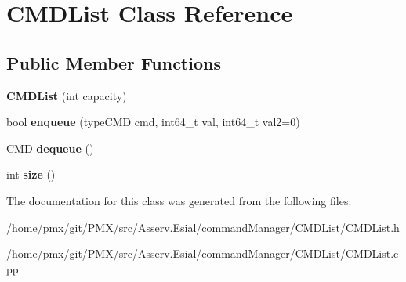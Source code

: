\hypertarget{classCMDList}{}\section{C\+M\+D\+List Class Reference}
\label{classCMDList}
\subsection*{Public Member Functions}
\begin{DoxyCompactItemize}
\item 
\mbox{\label{classCMDList_a3125b08098f9568b6a18175677d5fdf4}} 
{\bfseries C\+M\+D\+List} (int capacity)
\item 
\mbox{\label{classCMDList_adc5c7ef68e420eeea3974275b48bb7e8}} 
bool {\bfseries enqueue} (type\+C\+MD cmd, int64\+\_\+t val, int64\+\_\+t val2=0)
\item 
\mbox{\label{classCMDList_a630537657f6af92dfdd3ca4c93949f95}} 
\hyperlink{structCMD__struct}{C\+MD} {\bfseries dequeue} ()
\item 
\mbox{\label{classCMDList_a2f6d05220c0ced98488765f7280a5e62}} 
int {\bfseries size} ()
\end{DoxyCompactItemize}


The documentation for this class was generated from the following files\+:\begin{DoxyCompactItemize}
\item 
/home/pmx/git/\+P\+M\+X/src/\+Asserv.\+Esial/command\+Manager/\+C\+M\+D\+List/C\+M\+D\+List.\+h\item 
/home/pmx/git/\+P\+M\+X/src/\+Asserv.\+Esial/command\+Manager/\+C\+M\+D\+List/C\+M\+D\+List.\+cpp\end{DoxyCompactItemize}
